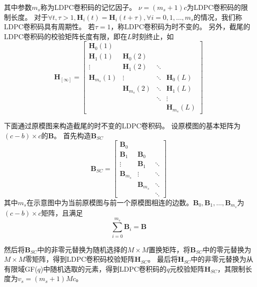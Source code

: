 其中参数$m_s$称为LDPC卷积码的记忆因子。
$\nu = (m_s+1)c$为LDPC卷积码的限制长度。
对于$\forall t,\tau>1,\mathbf{H}_i(t) = \mathbf{H}_i(t+\tau),\forall i = 0,1,\dots,m_s$的情况，我们称LDPC卷积码具有周期性。
若$\tau=1$，称LDPC卷积码为时不变的。
另外，截尾的LDPC卷积码的校验矩阵长度有限，即在$L$时刻终止，如
\begin{equation}
    \mathbf{H}_{[\infty]} = \left[
          \begin{array}{cccc}
            \mathbf{H}_0(1) & & & \\
            \mathbf{H}_1(1) & \mathbf{H}_0(2) & & \\
            \vdots & \mathbf{H}_1(2) & \ddots & \\
            \mathbf{H}_{m_s}(1) & \vdots & \ddots & \mathbf{H}_0(L) \\
             & \mathbf{H}_{m_s}(2) & \ddots & \mathbf{H}_1(L) \\
             & & \ddots & \vdots \\
             & & & \mathbf{H}_{m_s}(L)
          \end{array} \right]
\end{equation}

下面通过原模图来构造截尾的时不变的LDPC卷积码。
设原模图的基本矩阵为$(c-b)\times c$的$\mathbf{B}$。
首先构造$\mathbf{B}_{SC}$
\begin{equation}
    \mathbf{B}_{SC} = \left[
          \begin{array}{ccc}
            \mathbf{B}_0& & \\
            \mathbf{B}_1 & \mathbf{B}_0 & \\
            \vdots & \mathbf{B}_1 & \ddots \\
            \mathbf{B}_{m_s} & \vdots & \ddots \\
             & \mathbf{B}_{m_s} & \ddots \\
             & & \ddots 
          \end{array} \right]
\end{equation}
其中$m_s$在示意图中为当前原模图与前一个原模图相连的边数。$\mathbf{B}_0 , \mathbf{B}_1 , \dots , \mathbf{B}_{m_s}$为$(c-b)\times c$矩阵，且满足
\begin{equation}
\sum^{m_s}_{i=0} \mathbf{B}_i = \mathbf{B}
\end{equation}

然后将$\mathbf{B}_{SC}$中的非零元替换为随机选择的$M \times M$置换矩阵，将$\mathbf{B}_{SC}$中的零元替换为$M \times M$零矩阵，得到LDPC卷积码校验矩阵$\mathbf{H}_{SC}$。
最后将$\mathbf{H}_{SC}$中的非零元替换为从有限域GF($q$)中随机选取的元素，得到LDPC卷积码的$q$元校验矩阵$\mathbf{H}_{SC}$，其限制长度为$v_s=(m_s+1)Mc$。

